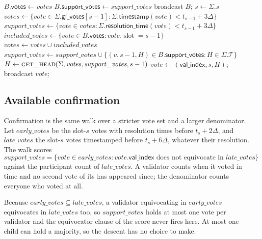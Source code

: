 \documentclass{article}
\theoremstyle{plain}
\theoremstyle{definition}
\theoremstyle{remark}
\newcommand{\slot}{\operatorname{slot}}
\newcommand{\valindex}{\mathsf{val\_index}}
\newcommand{\committee}{\mathcal K}
\newcommand{\T}{\mathcal T}
\newcommand{\gfPool}{\mathsf{gf\_votes}}
\newcommand{\timestamp}{\mathsf{timestamp}}
\newcommand{\resolutionTime}{\mathsf{resolution\_time}}
\begin{document}
{\begin{algorithmic}[1]
  \State $B.\mathsf{votes}\gets\mathit{votes}$
  \State $B.\mathsf{support\_votes}\gets\mathit{support\_votes}$
  \State broadcast $B$; 
\EndFunction
\vspace{1pt}
  \State $s\gets\Sigma.s$
  \State $\mathit{votes}\gets\{\mathit{vote}\in\Sigma.\gfPool[s-1]:
    \Sigma.\timestamp(\mathit{vote})<t_{s-1}+3\Delta\}$
  \State $\mathit{support\_votes}\gets\{\mathit{vote}\in\mathit{votes}:
    \Sigma.\resolutionTime(\mathit{vote})<t_{s-1}+3\Delta\}$
  \ForAll{$B\in\Sigma.\T$ with $B.\slot=s$}
    \State $\mathit{included\_votes}\gets
      \{\mathit{vote}\in B.\mathsf{votes}:\mathit{vote}.\slot=s-1\}$
    \State $\mathit{votes}\gets\mathit{votes}\cup\mathit{included\_votes}$
    \State $\mathit{support\_votes}\gets\mathit{support\_votes}\cup
      \{(v,s-1,H)\in B.\mathsf{support\_votes}:H\in\Sigma.\T\}$
  \EndFor
  \State $H\gets\Call{get\_head}{\Sigma,\mathit{votes},
    \mathit{support\_votes},s-1}$
  \If{$\valindex\in\committee_s$}
    \State $\mathit{vote}\gets(\valindex,s,H)$; broadcast $\mathit{vote}$;
  \EndIf
\EndFunction
\end{algorithmic}
}

\subsection{Available confirmation}\label{sec:available-confirmation}

Confirmation is the same walk over a stricter vote set and a larger
denominator.  Let $\mathit{early\_votes}$ be the slot-$s$ votes with
resolution times before $t_s+2\Delta$, and $\mathit{late\_votes}$ the slot-$s$ votes
timestamped before $t_s+6\Delta$, whatever their resolution.  The walk scores
\[
 \mathit{support\_votes}=\{\mathit{vote}\in\mathit{early\_votes}:
  \mathit{vote}.\valindex\text{ does not equivocate in }
  \mathit{late\_votes}\}
\]
against the participant count of $\mathit{late\_votes}$.  A validator counts when it
voted in time and no second vote of its has appeared since; the denominator
counts everyone who voted at all.

Because $\mathit{early\_votes}\subseteq\mathit{late\_votes}$, a validator
equivocating in $\mathit{early\_votes}$ equivocates in
$\mathit{late\_votes}$ too, so $\mathit{support\_votes}$
holds at most one vote per validator and the equivocator clause of the score
never fires here.  At most one child can hold a majority, so the descent
has no choice to make.
\end{document}
